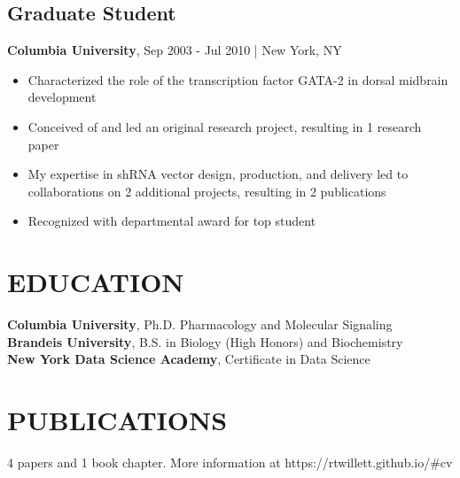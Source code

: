 \documentclass[11pt]{article}
\newenvironment{myitemize}
{ \begin{itemize}
	\setlength{\itemsep}{0pt}
	\setlength{\parskip}{0pt}
	\setlength{\parsep}{0pt}     }
{ \end{itemize}                  }
\begin{document}
\subsection*{Graduate Student}
\vspace{-3truemm}
{\bfseries Columbia University}, Sep 2003 - Jul 2010 | New York, NY
\begin{myitemize}
	\item Characterized the role of the transcription factor GATA-2 in dorsal midbrain development
	\item Conceived of and led an original research project, resulting in 1 research paper
	\item My expertise in shRNA vector design, production, and delivery led to collaborations on 2 additional projects, resulting in 2 publications
	\item Recognized with departmental award for top student
\end{myitemize}

\section*{EDUCATION}
\vspace{-3truemm}
{\bfseries Columbia University}, Ph.D. Pharmacology and Molecular Signaling \\
{\bfseries Brandeis University}, B.S. in Biology (High Honors) and Biochemistry \\
{\bfseries New York Data Science Academy}, Certificate in Data Science

\section*{PUBLICATIONS}
\vspace{-3truemm}
4 papers and 1 book chapter. More information at https://rtwillett.github.io/\#cv
\end{document}
